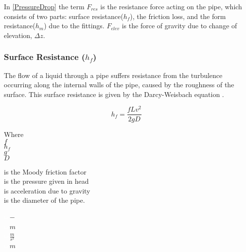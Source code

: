In \eqref{PressureDrop} the term $F_{res}$ is the resistance force acting on the 
pipe, which consists of two parts: surface resistance($h_{f}$), the friction 
loss, and the form resistance($h_{m}$) due to the fittings. $F_{elev}$ is the force of gravity due to change of elevation, $\Delta z$.

\subsubsection{Surface Resistance (\texorpdfstring{$h_f$}{})} 
The flow of a liquid through a pipe suffers resistance from 
the turbulence occurring along the internal walls of the pipe, caused by the roughness of the surface. This surface resistance is given by the Darcy-Weisbach equation \cite{Design_Water}.

\begin{equation}
  h_f = \frac{fLv^2}{2gD}
  \label{Darcy}
\end{equation}

 \begin{minipage}[t]{0.20\textwidth}
Where\\
\hspace*{8mm} $f$ \\
\hspace*{8mm} $h_f$ \\
\hspace*{8mm} $g$ \\
\hspace*{8mm} $D$ 
\end{minipage}
\begin{minipage}[t]{0.68\textwidth}
\vspace*{2mm}
is the Moody friction factor\\ 
is the pressure given in head\\ 
is acceleration due to gravity\\
is the diameter of the pipe.
\end{minipage}
\begin{minipage}[t]{0.10\textwidth}
\vspace*{2mm}
\textcolor{White}{te}$\unit{-}$\\
\textcolor{White}{te}$\unit{m}$\\
\textcolor{White}{te}$\unit{\frac{m}{s^2}}$\\
\textcolor{White}{te}$\unit{m}$
\end{minipage}


